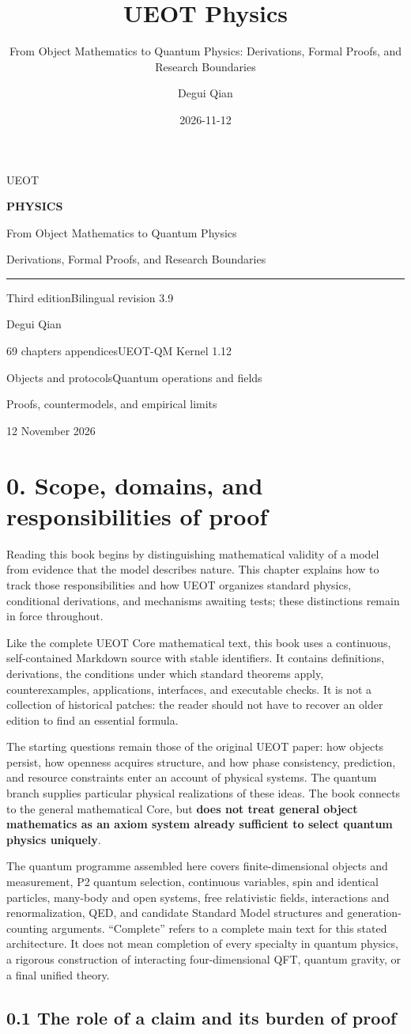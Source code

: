 \documentclass[
  11pt,
  oneside]{book}
\title{UEOT Physics}
\subtitle{From Object Mathematics to Quantum Physics: Derivations,
Formal Proofs, and Research Boundaries}
\author{Degui Qian}
\date{2026-11-12}
\renewcommand{\maketitle}{
  \begin{titlepage}
  \thispagestyle{empty}
  \vspace*{30mm}
  {\color{teal}\fontsize{46}{52}\selectfont UEOT\par}
  \vspace{5mm}
  {\fontsize{32}{40}\selectfont\bfseries PHYSICS\par}
  \vspace{11mm}
  {\Large From Object Mathematics to Quantum Physics\par}
  \vspace{4mm}
  {\large Derivations, Formal Proofs, and Research Boundaries\par}
  \vspace{10mm}
  {\color{teal}\rule{\textwidth}{1pt}\par}
  \vspace{7mm}
  {\large Third edition\quad Bilingual revision 3.9\par}
  \vspace{6mm}
  {Degui Qian\par}
  \vspace{5mm}
  {69 chapters\quad 6 appendices\quad UEOT-QM Kernel 1.12\par}
  \vfill
  {Objects and protocols\quad Quantum operations and fields\par}
  \vspace{3mm}
  {Proofs, countermodels, and empirical limits\par}
  \vspace{7mm}
  {12 November 2026\par}
  \end{titlepage}
}
\begin{document}
\frontmatter
\maketitle

{
\hypersetup{linkcolor=}
\setcounter{tocdepth}{0}
\tableofcontents
}
\mainmatter
\chapter{0. Scope, domains, and responsibilities of proof}\label{ch-0}

Reading this book begins by distinguishing mathematical validity of a
model from evidence that the model describes nature. This chapter
explains how to track those responsibilities and how UEOT organizes
standard physics, conditional derivations, and mechanisms awaiting
tests; these distinctions remain in force throughout.

Like the complete UEOT Core mathematical text, this book uses a
continuous, self-contained Markdown source with stable identifiers. It
contains definitions, derivations, the conditions under which standard
theorems apply, counterexamples, applications, interfaces, and
executable checks. It is not a collection of historical patches: the
reader should not have to recover an older edition to find an essential
formula.

The starting questions remain those of the original UEOT paper: how
objects persist, how openness acquires structure, and how phase
consistency, prediction, and resource constraints enter an account of
physical systems. The quantum branch supplies particular physical
realizations of these ideas. The book connects to the general
mathematical Core, but \textbf{does not treat general object mathematics
as an axiom system already sufficient to select quantum physics
uniquely}.

The quantum programme assembled here covers finite-dimensional objects
and measurement, P2 quantum selection, continuous variables, spin and
identical particles, many-body and open systems, free relativistic
fields, interactions and renormalization, QED, and candidate Standard
Model structures and generation-counting arguments. ``Complete'' refers
to a complete main text for this stated architecture. It does not mean
completion of every specialty in quantum physics, a rigorous
construction of interacting four-dimensional QFT, quantum gravity, or a
final unified theory.

\section{0.1 The role of a claim and its burden of proof}
\end{document}
